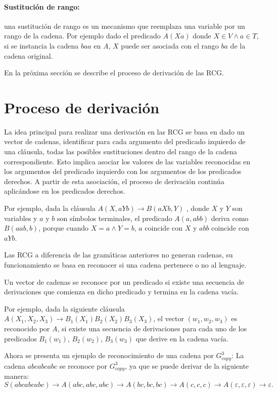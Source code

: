 \documentclass[12pt]{article}
\begin{document}
\paragraph{Sustitución de rango:} una sustitución de rango es un mecanismo que reemplaza una
variable por un rango de la cadena. Por ejemplo dado el predicado $A(Xa)$ donde $X \in V \wedge a \in T$,
si se instancia la cadena $baa$ en $A$, $X$ puede ser asociada con el rango $ba$ de la cadena original.

En la próxima sección se describe el proceso de derivación de las RCG.
\section{Proceso de derivación}

La idea principal para realizar una derivación en las RCG se basa en dado un vector de cadenas, identificar para cada argumento del
predicado izquierdo de una cláusula, todas las posibles sustituciones dentro del rango de la cadena correspondiente.
Esto implica asociar los valores de las variables reconocidas en los argumentos del predicado izquierdo con los
argumentos de los predicados derechos. A partir de esta asociación, el proceso de derivación continúa
aplicándose en los predicados derechos.

Por ejemplo, dada la cláusula $A(X,aYb)\to B(aXb,Y)$ , donde $X$ y $Y$ son variables y $a$ y $b$ son
símbolos terminales, el predicado $A(a,abb)$ deriva como $B(aab,b)$, porque cuando $ X=a \wedge Y=b$,
$a$ coincide con $X$ y $abb$ coincide con $aYb$.

Las RCG a diferencia de las gramáticas anteriores no generan cadenas, su funcionamiento se basa en reconocer si
una cadena pertenece o no al lenguaje.

Un vector de cadenas se reconoce por un predicado si existe una secuencia de derivaciones
que comienza en dicho predicado y termina en la cadena vacía.

Por ejemplo, dada la siguiente cláusula $A(X_1,X_2,X_3)\to B_1(X_1)B_2(X_2)B_3(X_3)$, el vector $(w_1,w_2,w_3)$ es reconocido
por $A$, si existe una secuencia de derivaciones para cada
uno de los predicados $B_1(w_1)$, $B_2(w_2)$, $B_3(w_3)$ que derive en la cadena vacía.

Ahora se presenta un ejemplo de reconocimiento de una cadena por $G^3_{copy}$: La cadena $abcabcabc$ se reconoce por $G^3_{copy}$, ya que se puede derivar de la siguiente manera:
$$S(abcabcabc)\to A(abc,abc,abc)\to A(bc,bc,bc)\to A(c,c,c)\to A(\varepsilon,\varepsilon,\varepsilon)\to \varepsilon.$$
\end{document}
